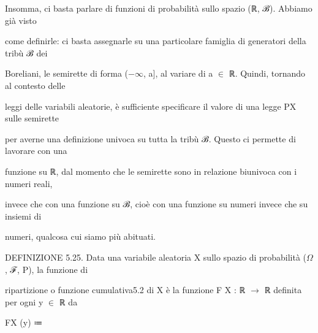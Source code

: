 \documentclass[a4paper,portrait,12pt]{article}
\begin{document}
\begin{flushleft}
Insomma, ci basta parlare di funzioni di probabilit\`{a} sullo spazio (ℝ, ℬ). Abbiamo gi\`{a} visto
\end{flushleft}


\begin{flushleft}
come definirle: ci basta assegnarle su una particolare famiglia di generatori della tribù ℬ dei
\end{flushleft}


\begin{flushleft}
Boreliani, le semirette di forma ($-$$\infty$, a], al variare di a $\in$ ℝ. Quindi, tornando al contesto delle
\end{flushleft}


\begin{flushleft}
leggi delle variabili aleatorie, \`{e} sufficiente specificare il valore di una legge PX sulle semirette
\end{flushleft}


\begin{flushleft}
per averne una definizione univoca su tutta la tribù ℬ. Questo ci permette di lavorare con una
\end{flushleft}


\begin{flushleft}
funzione su ℝ, dal momento che le semirette sono in relazione biunivoca con i numeri reali,
\end{flushleft}


\begin{flushleft}
invece che con una funzione su ℬ, cio\`{e} con una funzione su numeri invece che su insiemi di
\end{flushleft}


\begin{flushleft}
numeri, qualcosa cui siamo più abituati.
\end{flushleft}


\begin{flushleft}
DEFINIZIONE 5.25. Data una variabile aleatoria X sullo spazio di probabilit\`{a} ($\Omega$, ℱ, P), la funzione di
\end{flushleft}


\begin{flushleft}
ripartizione o funzione cumulativa5.2 di X \`{e} la funzione F X : ℝ $\rightarrow$ ℝ definita per ogni y $\in$ ℝ da
\end{flushleft}


\begin{flushleft}
FX (y) ≔
\end{flushleft}
\end{document}
